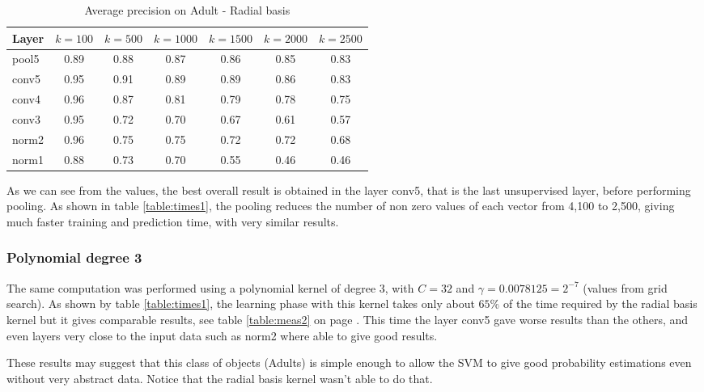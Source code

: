 \begin{table*}[t!]
\caption{Average precision on Adult - Radial basis}
\centering
\begin{tabular}{lcccccc}
    Layer       & $k=100$ & $k=500$ & $k=1000$ & $k=1500$ &
    $k=2000$ & $k=2500$ \\
    \midrule
    pool5        & 0.89 & 0.88 & 0.87 & 0.86 & 0.85 & 0.83 \\
    conv5        & 0.95 & 0.91 & 0.89 & 0.89 & 0.86 & 0.83 \\
    conv4        & 0.96 & 0.87 & 0.81 & 0.79 & 0.78 & 0.75 \\
    conv3        & 0.95 & 0.72 & 0.70 & 0.67 & 0.61 & 0.57 \\
    norm2        & 0.96 & 0.75 & 0.75 & 0.72 & 0.72 & 0.68 \\
    norm1        & 0.88 & 0.73 & 0.70 & 0.55 & 0.46 & 0.46 \\
\end{tabular}
\label{table:meas1}
\end{table*}

As we can see from the values, the best overall result is obtained in the layer
conv5, that is the last unsupervised layer, before performing pooling. As shown
in table \ref{table:times1}, the pooling reduces the number of non zero values
of each vector from 4,100 to 2,500, giving much faster training and prediction
time, with very similar results.

\subsubsection{Polynomial degree 3}

The same computation was performed using a polynomial kernel of degree 3, with
$C=32$ and $\gamma=0.0078125=2^{-7}$ (values from grid search). As shown by
table \ref{table:times1}, the learning phase with this kernel takes only about
$65\%$ of the time required by the radial basis kernel but it gives comparable
results, see table \ref{table:meas2} on page \pageref{table:meas2}.  This time
the layer conv5 gave worse results than the others, and even layers very close
to the input data such as norm2 where able to give good results.

These results may suggest that this class of objects (Adults) is simple enough
to allow the SVM to give good probability estimations even without very abstract
data. Notice that the radial basis kernel wasn't able to do that. 

